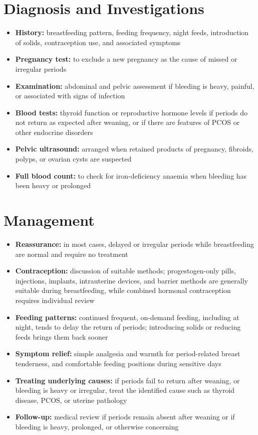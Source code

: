\section*{Diagnosis and Investigations}
\begin{itemize}
    \item \textbf{History:} breastfeeding pattern, feeding frequency, night feeds, introduction of solids, contraception use, and associated symptoms
    \item \textbf{Pregnancy test:} to exclude a new pregnancy as the cause of missed or irregular periods
    \item \textbf{Examination:} abdominal and pelvic assessment if bleeding is heavy, painful, or associated with signs of infection
    \item \textbf{Blood tests:} thyroid function or reproductive hormone levels if periods do not return as expected after weaning, or if there are features of PCOS or other endocrine disorders
    \item \textbf{Pelvic ultrasound:} arranged when retained products of pregnancy, fibroids, polyps, or ovarian cysts are suspected
    \item \textbf{Full blood count:} to check for iron-deficiency anaemia when bleeding has been heavy or prolonged
\end{itemize}

\section*{Management}
\begin{itemize}
    \item \textbf{Reassurance:} in most cases, delayed or irregular periods while breastfeeding are normal and require no treatment
    \item \textbf{Contraception:} discussion of suitable methods; progestogen-only pills, injections, implants, intrauterine devices, and barrier methods are generally suitable during breastfeeding, while combined hormonal contraception requires individual review
    \item \textbf{Feeding patterns:} continued frequent, on-demand feeding, including at night, tends to delay the return of periods; introducing solids or reducing feeds brings them back sooner
    \item \textbf{Symptom relief:} simple analgesia and warmth for period-related breast tenderness, and comfortable feeding positions during sensitive days
    \item \textbf{Treating underlying causes:} if periods fail to return after weaning, or bleeding is heavy or irregular, treat the identified cause such as thyroid disease, PCOS, or uterine pathology
    \item \textbf{Follow-up:} medical review if periods remain absent after weaning or if bleeding is heavy, prolonged, or otherwise concerning
\end{itemize}

